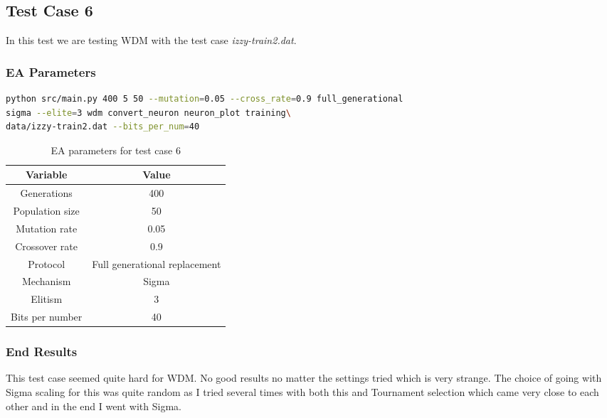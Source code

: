 \subsection{Test Case 6}\label{sec:test-case-6}
In this test we are testing WDM with the test case
\textit{izzy-train2.dat}.
\subsubsection{EA Parameters}\label{sec:test-case-6-parameters}
\begin{lstlisting}[frame=single, language=bash, caption=Command-line to
replicate the results]
python src/main.py 400 5 50 --mutation=0.05 --cross_rate=0.9 full_generational
sigma --elite=3 wdm convert_neuron neuron_plot training\
data/izzy-train2.dat --bits_per_num=40
\end{lstlisting}
\begin{table}
	\begin{tabular}{c c}
		Variable & Value \\
		\hline
		Generations & 400 \\
		\hline
		Population size & 50 \\
		\hline
		Mutation rate & 0.05 \\
		\hline
		Crossover rate & 0.9 \\
		\hline
		Protocol & Full generational replacement \\
		\hline
		Mechanism & Sigma \\
		\hline
		Elitism & 3 \\
		\hline
		Bits per number & 40 \\
	\end{tabular}
	\caption{EA parameters for test case 6}
\end{table}
\subsubsection{End Results}\label{sec:test-case-6-results}
This test case seemed quite hard for WDM. No good results no matter the settings
tried which is very strange. The choice of going with Sigma scaling for this was
quite random as I tried several times with both this and Tournament selection
which came very close to each other and in the end I went with Sigma.

